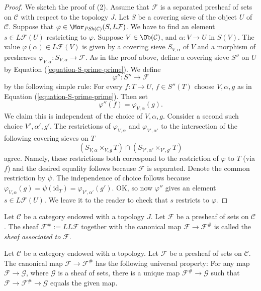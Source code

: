 \begin{proof}
\medskip\noindent
We sketch the proof of (2). Assume that $\mathcal{F}$ is a
separated presheaf of sets on $\mathcal{C}$ with respect to
the topology $J$.
Let $S$ be a covering sieve of the object $U$ of $\mathcal{C}$.
Suppose that $\varphi \in \Mor_{\textit{PSh}(\mathcal{C})}(S, L\mathcal{F})$.
We have to find an element $s \in L\mathcal{F}(U)$ restricting
to $\varphi$. Suppose $V\in \Ob(\mathcal{C})$, and
$\alpha : V \to U$ in $S(V)$. The value $\varphi(\alpha)
\in L\mathcal{F}(V)$ is given by a covering sieve
$S_{V, \alpha}$ of $V$ and a morphism of presheaves
$\varphi_{V, \alpha} : S_{V, \alpha} \to \mathcal{F}$.
As in the proof above, define a covering sieve $S''$ on $U$ by
Equation (\ref{equation-S-prime-prime}). We define
$$
\varphi'' : S'' \longrightarrow \mathcal{F}
$$
by the following simple rule: For every $f : T \to U$,
$f \in S''(T)$ choose $V, \alpha, g$ as in
Equation (\ref{equation-S-prime-prime}). Then set
$$
\varphi''(f) = \varphi_{V, \alpha}(g).
$$
We claim this is independent of the
choice of $V, \alpha, g$.
Consider a second such choice $V', \alpha', g'$.
The restrictions of $\varphi_{V, \alpha}$ and
$\varphi_{V', \alpha'}$ to the intersection
of the following covering sieves on $T$
$$
(S_{V, \alpha} \times_{V, g} T) \cap (S_{V', \alpha'} \times_{V', g'} T)
$$
agree. Namely, these restrictions both correspond to the
restriction of $\varphi$ to $T$ (via $f$) and the desired
equality follows because $\mathcal{F}$ is separated.
Denote the common restriction by $\psi$.
The independence of choice follows because
$\varphi_{V, \alpha}(g) = \psi(\text{id}_T) =
\varphi_{V', \alpha'}(g')$. OK, so now $\varphi''$
gives an element $s \in L\mathcal{F}(U)$. We leave it to
the reader to check that $s$ restricts to $\varphi$.
\end{proof}

\begin{definition}
\label{definition-associated-sheaf-topology}
Let $\mathcal{C}$ be a category endowed with a topology $J$.
Let $\mathcal{F}$ be a presheaf of sets on $\mathcal{C}$.
The sheaf $\mathcal{F}^\# := LL\mathcal{F}$
together with the canonical map $\mathcal{F} \to \mathcal{F}^\#$
is called the {\it sheaf associated to $\mathcal{F}$}.
\end{definition}

\begin{proposition}
\label{proposition-sheafification-adjoint-topology}
Let $\mathcal{C}$ be a category endowed with a topology.
Let $\mathcal{F}$ be a presheaf of sets on $\mathcal{C}$.
The canonical map $\mathcal{F} \to \mathcal{F}^\#$ has the
following universal property: For any map
$\mathcal{F} \to \mathcal{G}$,
where $\mathcal{G}$ is a sheaf of sets, there is a unique map
$\mathcal{F}^\# \to \mathcal{G}$ such that $\mathcal{F} \to \mathcal{F}^\#
\to \mathcal{G}$ equals the given map.
\end{proposition}

